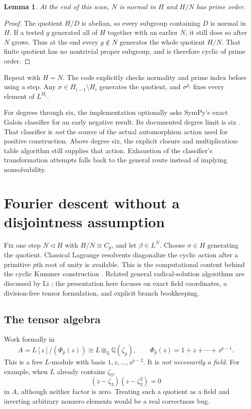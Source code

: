 \documentclass[11pt]{article}
\newtheorem{lemma}[theorem]{Lemma}
\theoremstyle{definition}\newtheorem{definition}[theorem]{Definition}
\theoremstyle{remark}\newtheorem{remark}[theorem]{Remark}
\newcommand{\Q}{\mathbb Q}\newcommand{\C}{\mathbb C}\newcommand{\Z}{\mathbb Z}
\begin{document}
\begin{lemma}
At the end of this scan, $N$ is normal in $H$ and $H/N$ has prime order.
\end{lemma}
\begin{proof}
The quotient $H/D$ is abelian, so every subgroup containing $D$ is normal in
$H$. If a tested $g$ generated all of $H$ together with an earlier $N$, it still
does so after $N$ grows. Thus at the end every $g\notin N$ generates the whole
quotient $H/N$. That finite quotient has no nontrivial proper subgroup, and
is therefore cyclic of prime order.
\end{proof}

Repeat with $H=N$. The code explicitly checks normality and prime index before
using a step. Any $\sigma\in H_{i-1}\setminus H_i$ generates the quotient,
and $\sigma^{p_i}$ fixes every element of $L^{H_i}$.

For degrees through six, the implementation optionally asks SymPy's exact
Galois classifier for an early negative result. Its documented degree limit
is six \cite{sympy-fields}. That classifier is \emph{not} the source of the
actual automorphism action used for positive construction. Above degree six,
the explicit closure and multiplication-table algorithm still supplies that
action. Exhaustion of the classifier's transformation attempts falls back to
the general route instead of implying nonsolvability.

\section{Fourier descent without a disjointness assumption}\label{sec:fourier}

Fix one step $N\triangleleft H$ with $H/N\cong C_p$, and let
$\beta\in L^N$. Choose $\sigma\in H$ generating the quotient. Classical
Lagrange resolvents diagonalize the cyclic action after a primitive $p$th root
of unity is available. This is the computational content behind the cyclic
Kummer construction \cite{milne}. Related general radical-solution algorithms
are discussed by Li \cite{li}; the presentation here focuses on exact field
coordinates, a division-free tensor formulation, and explicit branch bookkeeping.

\subsection{The tensor algebra}

Work formally in
\begin{equation}\label{eq:tensor}
 A=L[z]/(\Phi_p(z))
   \cong L\otimes_{\Q}\Q(\zeta_p),\qquad
 \Phi_p(z)=1+z+\cdots+z^{p-1}.
\end{equation}
This is a free $L$-module with basis $1,z,\ldots,z^{p-2}$. It is \emph{not
necessarily a field}. For example, when $L$ already contains $\zeta_3$,
\begin{equation}
 (z-\zeta_3)(z-\zeta_3^2)=0
\end{equation}
in $A$, although neither factor is zero. Treating such a quotient as a field
and inverting arbitrary nonzero elements would be a real correctness bug.
\end{document}
